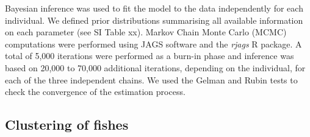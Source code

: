 \documentclass[
  letterpaper,
  DIV=11,
  numbers=noendperiod]{scrartcl}
\begin{document}
Bayesian inference was used to fit the model to the data independently
for each individual. We defined prior distributions summarising all
available information on each parameter (see SI Table xx). Markov Chain
Monte Carlo (MCMC) computations were performed using JAGS software and
the \emph{rjags} R package. A total of 5,000 iterations were performed
as a burn-in phase and inference was based on 20,000 to 70,000
additional iterations, depending on the individual, for each of the
three independent chains. We used the Gelman and Rubin tests to check
the convergence of the estimation process.

\hypertarget{clustering-of-fishes}{%
\subsection{Clustering of fishes}\label{clustering-of-fishes}}
\end{document}
